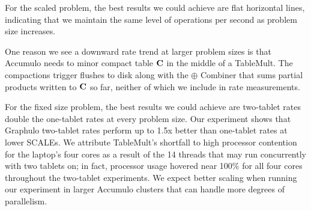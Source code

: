 For the scaled problem, the best results we could achieve are flat horizontal lines, 
indicating that we maintain the same level of operations per second as problem size increases.

One reason we see a downward rate trend at larger problem sizes is that Accumulo
needs to minor compact table $\mathbf{C}$ in the middle of a TableMult. 
The compactions trigger flushes to disk along with 
the $\oplus$ Combiner that sums partial products written to $\mathbf{C}$ so far, 
neither of which we include 
in rate measurements. %

For the fixed size problem, the best results we could achieve are two-tablet rates
double the one-tablet rates at every problem size.
Our experiment shows that Graphulo two-tablet rates perform up to 1.5x better
than one-tablet rates at lower SCALEs. %
We attribute TableMult's shortfall to high processor contention for the laptop's four cores as a result of 
the 14 threads that may run concurrently with two tablets on; in fact,
processor usage hovered near 100\% for all four cores throughout the two-tablet experiments.
We expect better scaling when running our experiment 
in larger Accumulo clusters that can handle more degrees of parallelism.

